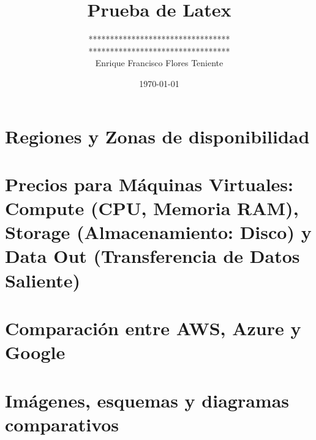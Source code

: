 \documentclass{article}
\title{Prueba de Latex}
\date{\today}
\author{
    ********************************* \\
    ********************************* \\
    Enrique Francisco Flores Teniente
  }
\affil{UTEC}
\begin{document}
\maketitle

\section{Regiones y Zonas de disponibilidad}
\section{Precios para Máquinas Virtuales: Compute (CPU, Memoria RAM), Storage (Almacenamiento: Disco) y Data Out (Transferencia de Datos Saliente)}
\section{Comparación entre AWS, Azure y Google}
\section{Imágenes, esquemas y diagramas comparativos}

\printbibliography
\end{document}
